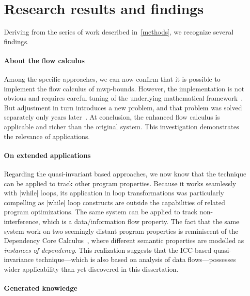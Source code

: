 \section{Research results and findings}
\label{subsec:results}

Deriving from the series of work described in~\autoref{methods}, we recognize several findings.

\paragraph{About the flow calculus}
Among the specific approaches, we can now confirm that it is possible to implement the flow calculus of mwp-bounds.
However, the implementation is not obvious and requires careful tuning of the underlying mathematical framework~\cite{aubert20222}.
But adjustment in turn introduces a new problem, and that problem was solved separately only years later~\cite{rusch2025}.
At conclusion, the enhanced flow calculus is applicable and richer than the original system.
This investigation demonstrates the relevance of applications.

\paragraph{On extended applications}
Regarding the quasi-invariant based approaches, we now know that the technique can be applied to track other program properties.
Because it works seamlessly with \pr|while| loops, its application in loop transformations was particularly compelling as
\pr|while| loop constructs are outside the capabilities of related program optimizations.
The same system can be applied to track non-interference, which is a data/information flow property.
The fact that the same system work on two seemingly distant program properties is reminiscent of the Dependency Core Calculus~\cite{abadi1999b},
where different semantic properties are modelled as \emph{instances of dependency}.
This realization suggests that the ICC-based quasi-invariance technique---which is also based on analysis of data flows---possesses wider applicability than yet discovered in this dissertation.

\paragraph{Generated knowledge}

